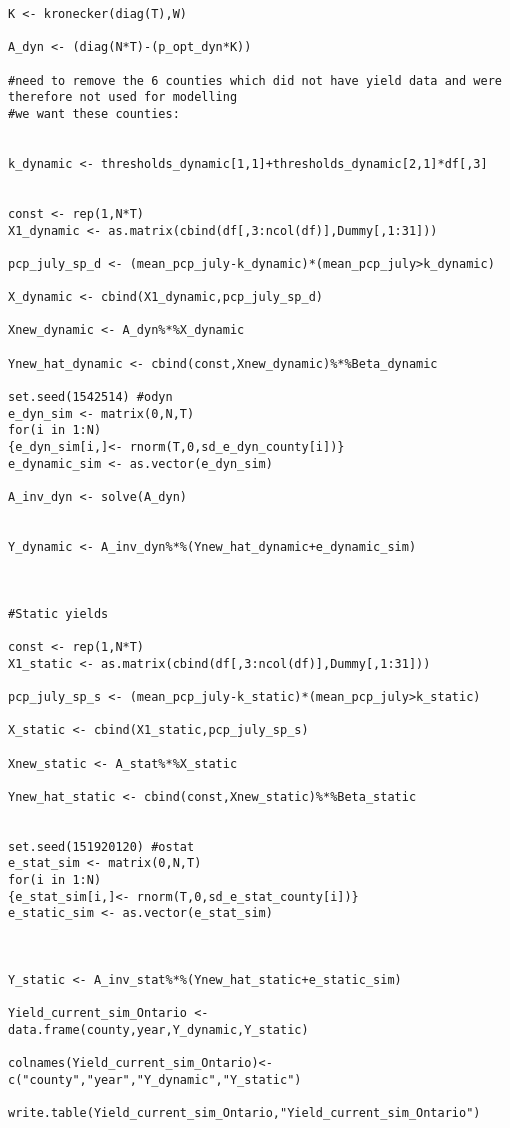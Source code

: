 \begin{lstlisting}
K <- kronecker(diag(T),W)

A_dyn <- (diag(N*T)-(p_opt_dyn*K))

#need to remove the 6 counties which did not have yield data and were therefore not used for modelling
#we want these counties: 


k_dynamic <- thresholds_dynamic[1,1]+thresholds_dynamic[2,1]*df[,3]


const <- rep(1,N*T)
X1_dynamic <- as.matrix(cbind(df[,3:ncol(df)],Dummy[,1:31]))

pcp_july_sp_d <- (mean_pcp_july-k_dynamic)*(mean_pcp_july>k_dynamic)

X_dynamic <- cbind(X1_dynamic,pcp_july_sp_d)

Xnew_dynamic <- A_dyn%*%X_dynamic

Ynew_hat_dynamic <- cbind(const,Xnew_dynamic)%*%Beta_dynamic

set.seed(1542514) #odyn
e_dyn_sim <- matrix(0,N,T)
for(i in 1:N)
{e_dyn_sim[i,]<- rnorm(T,0,sd_e_dyn_county[i])}
e_dynamic_sim <- as.vector(e_dyn_sim)

A_inv_dyn <- solve(A_dyn)


Y_dynamic <- A_inv_dyn%*%(Ynew_hat_dynamic+e_dynamic_sim)



#Static yields

const <- rep(1,N*T)
X1_static <- as.matrix(cbind(df[,3:ncol(df)],Dummy[,1:31]))

pcp_july_sp_s <- (mean_pcp_july-k_static)*(mean_pcp_july>k_static)

X_static <- cbind(X1_static,pcp_july_sp_s)

Xnew_static <- A_stat%*%X_static

Ynew_hat_static <- cbind(const,Xnew_static)%*%Beta_static


set.seed(151920120) #ostat
e_stat_sim <- matrix(0,N,T)
for(i in 1:N)
{e_stat_sim[i,]<- rnorm(T,0,sd_e_stat_county[i])}
e_static_sim <- as.vector(e_stat_sim)



Y_static <- A_inv_stat%*%(Ynew_hat_static+e_static_sim)

Yield_current_sim_Ontario <- data.frame(county,year,Y_dynamic,Y_static)

colnames(Yield_current_sim_Ontario)<-c("county","year","Y_dynamic","Y_static")

write.table(Yield_current_sim_Ontario,"Yield_current_sim_Ontario")


\end{lstlisting}

